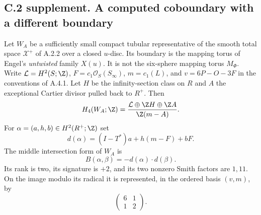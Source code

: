 \subsection{C.2 supplement. A computed coboundary with a different boundary}

\begin{proposition}
Let $W_A$ be a sufficiently small compact tubular representative of the
smooth total space $\mathcal X^+$ of A.2.2 over a closed $u$-disc.
Its boundary is the mapping torus of Engel's \emph{untwisted} family
$X(u)$. It is not the six-sphere mapping torus $M_\Phi$.
Write $\mathcal L=H^2(S;\Z)$, $F=c_1\mathcal O_S(S_\infty)$,
$m=c_1(L)$, and $v=6P-O-3F$ in the conventions of A.4.1.
Let $H$ be the infinity-section class on $R$ and $A$ the exceptional
Cartier divisor pulled back to $R^+$. Then
\[
 H_4(W_A;\Z)=
 \frac{\mathcal L\oplus\Z H\oplus\Z A}{\Z(m-A)}.
\]
For $\alpha=(a,h,b)\in H^2(R^+;\Z)$ set
\[
 d(\alpha)=(I-T^*)a+h(m-F)+bF.
\]
The middle intersection form of $W_A$ is
\[
 B(\alpha,\beta)=-d(\alpha)\cdot d(\beta).
\]
Its rank is two, its signature is $+2$, and its two nonzero Smith
factors are $1,11$. On the image modulo its radical it is represented,
in the ordered basis $(v,m)$, by
\[
 \begin{pmatrix}6&1\\1&2\end{pmatrix}.
\]
\end{proposition}

